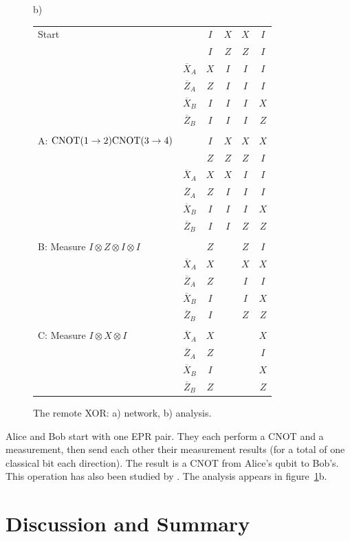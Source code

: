 \begin{figure}
b) \begin{tabular}[t]{lccccc}
Start & & $I$ & $X$ & $X$ & $I$ \\
& & $I$ & $Z$ & $Z$ & $I$ \\
& $\overline{X}_A$ & $X$ & $I$ & $I$ & $I$ \\
& $\overline{Z}_A$ & $Z$ & $I$ & $I$ & $I$ \\
& $\overline{X}_B$ & $I$ & $I$ & $I$ & $X$ \\
& $\overline{Z}_B$ & $I$ & $I$ & $I$ & $Z$ \\
\\
A: ${\rm CNOT} (1 \rightarrow 2) {\rm CNOT} (3 \rightarrow 4)$ & & $I$
& $X$ & $X$ & $X$ \\
& & $Z$ & $Z$ & $Z$ & $I$ \\
& $\overline{X}_A$ & $X$ & $X$ & $I$ & $I$ \\
& $\overline{Z}_A$ & $Z$ & $I$ & $I$ & $I$ \\
& $\overline{X}_B$ & $I$ & $I$ & $I$ & $X$ \\
& $\overline{Z}_B$ & $I$ & $I$ & $Z$ & $Z$ \\
\\
B: Measure $I \otimes Z \otimes I \otimes I$ & & $Z$ & & $Z$ & $I$ \\
& $\overline{X}_A$ & $X$ & & $X$ & $X$ \\
& $\overline{Z}_A$ & $Z$ & & $I$ & $I$ \\
& $\overline{X}_B$ & $I$ & & $I$ & $X$ \\
& $\overline{Z}_B$ & $I$ & & $Z$ & $Z$ \\
\\
C: Measure $I \otimes X \otimes I$
& $\overline{X}_A$ & $X$ & & & $X$ \\
& $\overline{Z}_A$ & $Z$ & & & $I$ \\
& $\overline{X}_B$ & $I$ & & & $X$ \\
& $\overline{Z}_B$ & $Z$ & & & $Z$
\end{tabular}
\caption{The remote XOR: a) network, b) analysis.}
\label{fig:RXOR}
\end{figure}
Alice and Bob start with one EPR pair.  They each perform a CNOT and a
measurement, then send each other their measurement results (for a
total of one classical bit each direction).  The result is a CNOT from
Alice's qubit to Bob's.  This operation has also been studied by
\cite{RXOR}.  The analysis appears in figure~\ref{fig:RXOR}b.

\section{Discussion and Summary}

